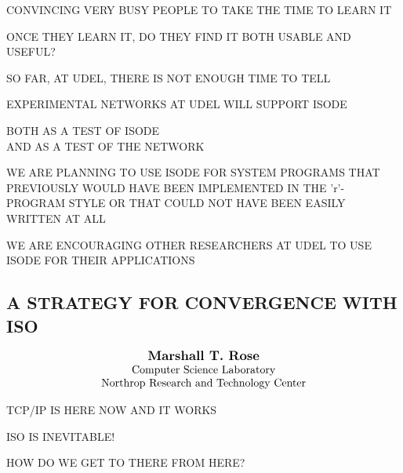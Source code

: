 \begin{bwslide}
\begin{nrtc}
\item	CONVINCING VERY BUSY PEOPLE TO TAKE THE TIME TO LEARN IT

\item	ONCE THEY LEARN IT, DO THEY FIND IT BOTH USABLE AND USEFUL? 
\end{nrtc}

SO FAR, AT UDEL, THERE IS NOT ENOUGH TIME TO TELL
\end{bwslide}


\begin{bwslide}

\begin{nrtc}
\item	 EXPERIMENTAL NETWORKS AT UDEL WILL SUPPORT ISODE
    \begin{nrtc}
    \item	BOTH AS A TEST OF ISODE\\ AND AS A TEST OF THE NETWORK
    \end{nrtc}

\item	WE ARE PLANNING TO USE ISODE FOR SYSTEM PROGRAMS THAT 
	PREVIOUSLY WOULD HAVE BEEN IMPLEMENTED IN THE 'r'-PROGRAM STYLE OR
	THAT COULD NOT HAVE BEEN EASILY WRITTEN AT ALL

\item	WE ARE ENCOURAGING OTHER RESEARCHERS AT UDEL TO USE ISODE FOR THEIR
	APPLICATIONS
\end{nrtc}
\end{bwslide}


\begin{bwslide}
\part	{A STRATEGY FOR CONVERGENCE WITH ISO}\bf

\vskip-0.5in
\[\begin{tabular}[t]{c}\large\bf
    Marshall T.~Rose\\
    Computer Science Laboratory\\
    Northrop Research and Technology Center
\end{tabular}\]
\end{bwslide}


\begin{bwslide}

\begin{nrtc}
\item	TCP/IP IS HERE NOW AND IT WORKS

\item	ISO IS INEVITABLE!

\item	HOW DO WE GET TO THERE FROM HERE?
\end{nrtc}
\end{bwslide}


